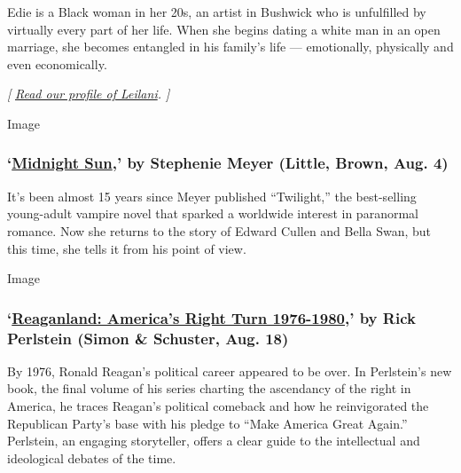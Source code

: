 Edie is a Black woman in her 20s, an artist in Bushwick who is
unfulfilled by virtually every part of her life. When she begins dating
a white man in an open marriage, she becomes entangled in his family's
life --- emotionally, physically and even economically.

\emph{{[}}
\href{https://www.nytimes.com/2020/07/31/books/raven-leilani-luster.html}{\emph{Read
our profile of Leilani}}\emph{. {]}}

Image

\hypertarget{midnight-sun-by-stephenie-meyer-little-brown-aug-4}{%
\subsubsection{\texorpdfstring{`\href{https://www.hachettebookgroup.com/titles/stephenie-meyer/midnight-sun/9780316592253/}{Midnight
Sun},' by Stephenie Meyer (Little, Brown, Aug.
4)}{`Midnight Sun,' by Stephenie Meyer (Little, Brown, Aug. 4)}}\label{midnight-sun-by-stephenie-meyer-little-brown-aug-4}}

It's been almost 15 years since Meyer published ``Twilight,'' the
best-selling young-adult vampire novel that sparked a worldwide interest
in paranormal romance. Now she returns to the story of Edward Cullen and
Bella Swan, but this time, she tells it from his point of view.

Image

\hypertarget{reaganland-americas-right-turn-1976-1980-by-rick-perlstein-simon--schuster-aug-18}{%
\subsubsection{\texorpdfstring{`\href{https://www.simonandschuster.com/books/Reaganland/Rick-Perlstein/9781476793054}{Reaganland:
America's Right Turn 1976-1980},' by Rick Perlstein (Simon \& Schuster,
Aug.
18)}{`Reaganland: America's Right Turn 1976-1980,' by Rick Perlstein (Simon \& Schuster, Aug. 18)}}\label{reaganland-americas-right-turn-1976-1980-by-rick-perlstein-simon--schuster-aug-18}}

By 1976, Ronald Reagan's political career appeared to be over. In
Perlstein's new book, the final volume of his series charting the
ascendancy of the right in America, he traces Reagan's political
comeback and how he reinvigorated the Republican Party's base with his
pledge to ``Make America Great Again.'' Perlstein, an engaging
storyteller, offers a clear guide to the intellectual and ideological
debates of the time.

